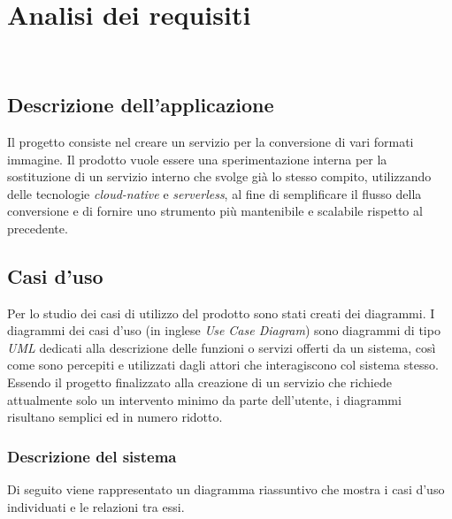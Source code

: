 
\chapter{Analisi dei requisiti}
\label{cap:analisi-requisiti}

\\

\section{Descrizione dell'applicazione}
Il progetto consiste nel creare un servizio per la
conversione di vari formati immagine. Il prodotto vuole essere una
sperimentazione interna per la sostituzione di un servizio interno che svolge
già lo stesso compito, utilizzando delle tecnologie \emph{cloud-native} e
\emph{serverless}, al fine di semplificare il flusso della conversione e di
fornire uno strumento più mantenibile e scalabile rispetto al precedente.\\


\section{Casi d'uso}

Per lo studio dei casi di utilizzo del prodotto sono stati creati dei diagrammi.
I diagrammi dei casi d'uso (in inglese \emph{Use Case Diagram}) sono diagrammi
di tipo \emph{UML} dedicati
alla descrizione delle funzioni o servizi offerti da un sistema, così come sono
percepiti e utilizzati dagli attori che interagiscono col sistema stesso.
Essendo il progetto finalizzato alla creazione di un servizio che richiede
attualmente solo un intervento minimo da parte dell'utente, i diagrammi risultano semplici ed in numero ridotto.

\subsection{Descrizione del sistema}
Di seguito viene rappresentato un diagramma riassuntivo che mostra i casi d'uso
individuati e le relazioni tra essi.

